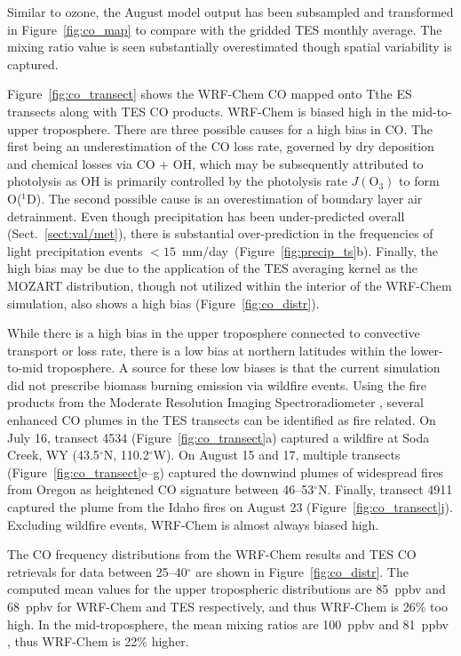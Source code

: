 Similar to ozone, the August model output has been subsampled and transformed
in Figure~\ref{fig:co_map} to compare with the gridded TES monthly average. The mixing
ratio value is seen substantially overestimated though spatial variability is captured.

Figure~\ref{fig:co_transect} shows the WRF-Chem
CO mapped onto Tthe ES transects along with TES CO products. WRF-Chem is
biased high in the mid-to-upper troposphere. There are three possible causes for a high
bias in CO. The first being an underestimation of the CO loss rate, governed by dry deposition
and chemical losses via CO + OH, which may be subsequently attributed to photolysis
as OH is primarily controlled by the photolysis rate $J(\mathrm{O}_3)$ to form O($^1$D). The second
possible cause is an overestimation of boundary layer air detrainment. Even though
precipitation has been under-predicted overall (Sect.~\ref{sect:val/met}), there is
substantial over-prediction in the frequencies of light precipitation events
$<15$~mm/day~(Figure~\ref{fig:precip_ts}b). Finally, the high bias may be due to the
application of the TES averaging kernel as the MOZART distribution, though not utilized within
the interior of the WRF-Chem simulation, also shows a high bias (Figure~\ref{fig:co_distr}).

While there is a high bias in the upper troposphere connected to convective transport
or loss rate, there is a low bias at northern latitudes within the lower-to-mid troposphere.
A source for these low biases is that the current simulation did not prescribe biomass
burning emission via wildfire events. Using the fire products from the Moderate
Resolution Imaging Spectroradiometer \citep[MODIS;][]{Justice:2002zr}, several
enhanced CO plumes in the TES transects can be identified as fire related. On July
16, transect 4534 (Figure~\ref{fig:co_transect}a) captured a wildfire at Soda Creek, WY
(43.5$^\circ$N, 110.2$^\circ$W). On August 15 and 17, multiple transects
(Figure~\ref{fig:co_transect}e--g) captured the downwind plumes of widespread fires from
Oregon as heightened CO signature between 46--53$^\circ$N. Finally, transect
4911 captured the plume from the Idaho fires on August 23 (Figure~\ref{fig:co_transect}j).
Excluding wildfire events, WRF-Chem is almost always biased high.

The CO frequency distributions from the WRF-Chem results and TES CO retrievals for data
between 25--40$^\circ$ are shown in Figure~\ref{fig:co_distr}. The computed
mean values for the upper tropospheric distributions are 85~ppbv and 68~ppbv for
WRF-Chem and TES respectively, and thus WRF-Chem is 26\% too high.
In the mid-troposphere, the mean mixing ratios are 100~ppbv and 81~ppbv , thus
WRF-Chem is 22\% higher.

